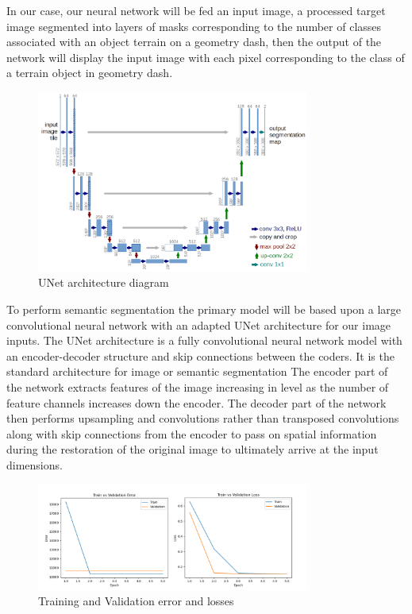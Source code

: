 \documentclass{article} %
\begin{document}
In our case, our neural network will be fed an input image, a processed target image segmented into layers of masks corresponding to the number of classes associated with an object terrain on a geometry dash, then the output of the network will display the input image with each pixel corresponding to the class of a terrain object in geometry dash. 

\begin{figure}[!h]
\begin{center}
\includegraphics[width=0.8\textwidth]{Figs/u-net-architecture.png}
\end{center}
\caption{UNet architecture diagram}
\label{fig:collision_box_issues}
\end{figure}

To perform semantic segmentation the primary model will be based upon a large convolutional neural network with an adapted UNet architecture for our image inputs. The UNet architecture is a fully convolutional neural network model with an encoder-decoder structure and skip connections between the coders. It is the standard architecture for image or semantic segmentation The encoder part of the network extracts features of the image increasing in level as the number of feature channels increases down the encoder. The decoder part of the network then performs upsampling and convolutions rather than transposed convolutions along with skip connections from the encoder to pass on spatial information during the restoration of the original image to ultimately arrive at the input dimensions. 

\label{last_page}

\begin{figure}[!h]
\begin{center}
\includegraphics[width=0.8\textwidth]{Figs/train val error.png}
\end{center}
\caption{Training and Validation error and losses}
\label{fig:collision_box_issues}
\end{figure}



\end{document}
